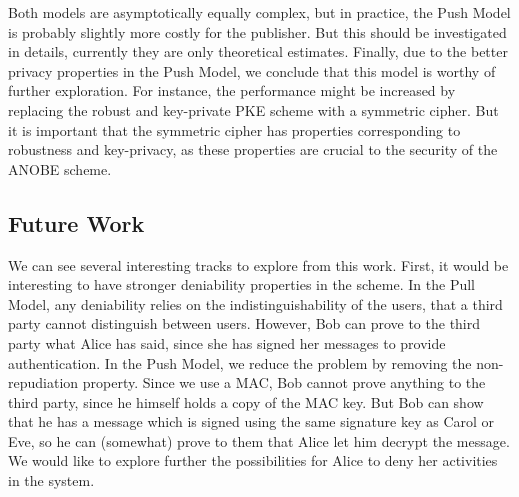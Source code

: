 Both models are asymptotically equally complex, but in practice, the Push Model 
is probably slightly more costly for the publisher.
But this should be investigated in details, currently they are only theoretical 
estimates.
Finally, due to the better privacy properties in the Push Model, we conclude 
that this model is worthy of further exploration.
For instance, the performance might be increased by replacing the robust and 
key-private \ac{PKE} scheme with a symmetric cipher.
But it is important that the symmetric cipher has properties corresponding to 
robustness and key-privacy, as these properties are crucial to the security of 
the \ac{ANOBE} scheme.

\subsection{Future Work}


We can see several interesting tracks to explore from this work.
First, it would be interesting to have stronger deniability properties in the 
scheme.
In the Pull Model, any deniability relies on the indistinguishability of the 
users, that a third party cannot distinguish between users.
However, Bob can prove to the third party what Alice has said, since she has 
signed her messages to provide authentication.
In the Push Model, we reduce the problem by removing the non-repudiation 
property.
Since we use a \ac{MAC}, Bob cannot prove anything to the third party, since he 
himself holds a copy of the \ac{MAC} key.
But Bob can show that he has a message which is signed using the same signature 
key as Carol or Eve, so he can (somewhat) prove to them that Alice let him 
decrypt the message.
We would like to explore further the possibilities for Alice to deny her 
activities in the system.

